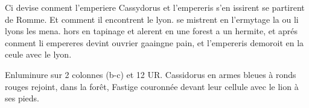 \documentclass{article}
\begin{document}
\begin{pages}
         
            Ci devise conment l’emperiere 
               Cassydorus
               et l’empereris s’en issirent
                  se partirent de Romme. Et comment il encontrent le lyon.
                  se mistrent en l'ermytage la ou li lyons les mena. 
               hors en tapinage et alerent en une 
               forest a un hermite, 
               et aprés conment li empereres devint ouvrier gaaingne pain, 
               et l’empereris demoroit en la ceule avec 
                  le lyon.
            
            
               Enluminure sur 2 colonnes (b-c) et 12 UR.
                  Cassidorus en armes bleues à ronds rouges rejoint, 
                  dans la forêt, Fastige couronnée devant leur cellule avec 
                  le lion à ses pieds.
               

\end{pages}
\end{document}
